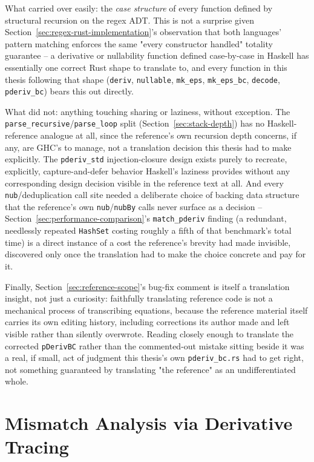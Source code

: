 What carried over easily: the \emph{case structure} of every function
defined by structural recursion on the regex ADT. This is not a surprise
given Section~\ref{sec:regex-rust-implementation}'s observation that
both languages' pattern matching enforces the same "every constructor
handled" totality guarantee -- a derivative or nullability function
defined case-by-case in Haskell has essentially one correct Rust shape to
translate to, and every function in this thesis following that shape
(\texttt{deriv}, \texttt{nullable}, \texttt{mk\_eps}, \texttt{mk\_eps\_bc},
\texttt{decode}, \texttt{pderiv\_bc}) bears this out directly.

What did not: anything touching sharing or laziness, without exception.
The \texttt{parse\_recursive}/\texttt{parse\_loop} split
(Section~\ref{sec:stack-depth}) has no Haskell-reference analogue at all,
since the reference's own recursion depth concerns, if any, are GHC's to
manage, not a translation decision this thesis had to make explicitly.
The \texttt{pderiv\_std} injection-closure design exists purely to
recreate, explicitly, capture-and-defer behavior Haskell's laziness
provides without any corresponding design decision visible in the
reference text at all. And every \texttt{nub}/deduplication call site
needed a deliberate choice of backing data structure that the reference's
own \texttt{nub}/\texttt{nubBy} calls never surface as a decision --
Section~\ref{sec:performance-comparison}'s \texttt{match\_pderiv} finding
(a redundant, needlessly repeated \texttt{HashSet} costing roughly a
fifth of that benchmark's total time) is a direct instance of a cost the
reference's brevity had made invisible, discovered only once the
translation had to make the choice concrete and pay for it.

Finally, Section~\ref{sec:reference-scope}'s bug-fix comment is itself a
translation insight, not just a curiosity: faithfully translating
reference code is not a mechanical process of transcribing equations,
because the reference material itself carries its own editing history,
including corrections its author made and left visible rather than
silently overwrote. Reading closely enough to translate the corrected
\texttt{pDerivBC} rather than the commented-out mistake sitting beside it
was a real, if small, act of judgment this thesis's own \texttt{pderiv\_bc.rs}
had to get right, not something guaranteed by translating "the reference"
as an undifferentiated whole.



\section{Mismatch Analysis via Derivative Tracing}
\label{sec:mismatch-analysis}

